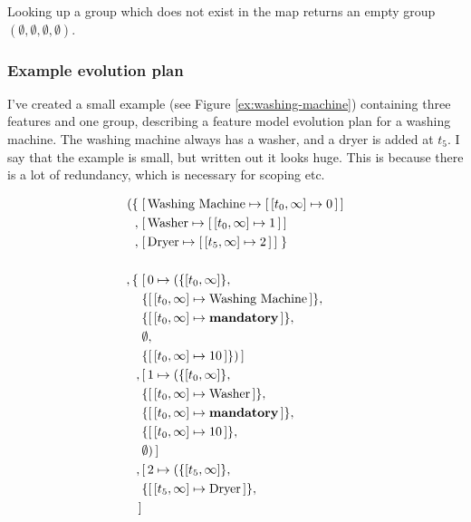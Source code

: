Looking up a group which does not exist in the map returns an empty group $(\emptyset \comma \emptyset \comma \emptyset \comma \emptyset)$. 

\subsubsection{Example evolution plan}
I've created a small example (see Figure \vref{ex:washing-machine}) containing three features and one group, describing a feature model evolution plan for a washing machine. The washing machine always has a washer, and a dryer is added at $t_5$. I say that the example is small, but written out it looks huge. This is because there is a lot of redundancy, which is necessary for scoping etc. 

\begin{figure}
  \begin{align*}
    ( \{ \; & \mapping{\text{Washing Machine}}{\intervalmapping{t_0}{\forever}{0}} \\
       ,\; & \mapping{\text{Washer}}{\intervalmapping{t_0}{\forever}{1}} \\
       ,\; & \mapping{\text{Dryer}}{\intervalmapping{t_5}{\forever}{2}}\; \} \\
       \\
       ,\{\; & \mapping{0}{(\{ \interval{t_0}{\forever}\} ,\, \\
             & \{\intervalmapping{t_0}{\forever}{\text{Washing Machine}}\} ,\, \\
             & \{\intervalmapping{t_0}{\forever}{\textbf{mandatory}}\} ,\, \\
             &  \emptyset ,\, \\ 
             & \{\intervalmapping{t_0}{\forever}{10}\} ) } \\
             ,\, & \mapping{1}{(\{\interval{t_0}{\forever}\} ,\, \\
             & \{\intervalmapping{t_0}{\forever}{\text{Washer}}\} ,\, \\
             & \{\intervalmapping{t_0}{\forever}{\textbf{mandatory}}\} ,\, \\
             &  \{\intervalmapping{t_0}{\forever}{10}\} ,\, \\ 
             & \emptyset)} \\
             ,\, & \mapping{2}{(\{\interval{t_5}{\forever}\} ,\, \\
             & \{\intervalmapping{t_5}{\forever}{\text{Dryer}}\} ,\, \\
}
\end{align*}
\end{figure}
